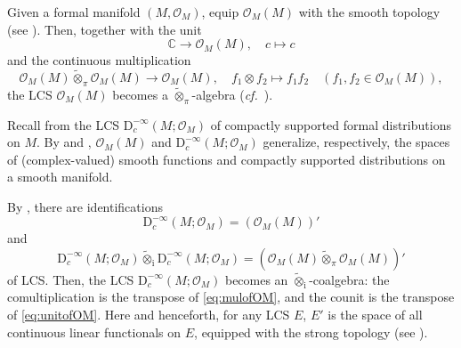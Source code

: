 \documentclass[12pt, a4paper]{amsart}
\newcommand{\BC}{{\mathbb {C}}}
\newcommand{\CO}{{\mathcal {O}}}
\newcommand{\RD}{{\mathrm {D}}}
\newcommand{\Ri}{{\mathrm{i}}}
\newcommand{\wt}{\widetilde}
\newcommand{\be}{\begin {equation}}
\newcommand{\ee}{\end {equation}}
\newcommand{\cf}{\textit{cf.}~}
\theoremstyle{Theorem}
\theoremstyle{Theorem}
\theoremstyle{Theorem}
\theoremstyle{Theorem}
\theoremstyle{Plain}
\theoremstyle{remark}
\theoremstyle{remark}
\theoremstyle{Definition}
\numberwithin{equation}{section}
\begin{document}
Given a formal manifold $(M,\mathcal{O}_M)$, equip $\mathcal{O}_M(M)$ with the smooth topology (see \cite[Definition 4.1]{CSW1}). Then, together with the unit
\begin{equation}\label{eq:unitofOM}
\mathbb{C} \rightarrow \mathcal{O}_M(M),\quad c \mapsto c
\end{equation}
and the continuous multiplication
\begin{equation}\label{eq:mulofOM}
\mathcal{O}_M(M) \wt{\otimes}_{\pi} \mathcal{O}_M(M) \rightarrow \mathcal{O}_M(M),\quad f_1 \otimes f_2 \mapsto f_1 f_2 \quad (f_1, f_2 \in \mathcal{O}_M(M)),
\end{equation}
the LCS $\mathcal{O}_M(M)$ becomes a $\wt{\otimes}_{\pi}$-algebra (\cf \cite[Proposition 4.8]{CSW1}).

Recall from \cite[Section 5]{CSW2} the LCS $\RD_c^{-\infty}(M;\mathcal{O}_M)$ of compactly supported formal distributions on $M$. By \cite[Example 4.2]{CSW1} and \cite[Theorem 1.1]{CSW2}, $\CO_M(M)$ and $\RD_c^{-\infty}(M;\mathcal{O}_M)$ generalize, respectively, the spaces of (complex-valued) smooth functions and compactly supported distributions on a smooth manifold.

By \cite[Proposition 5.14 and Lemma A.12]{CSW2}, there are  identifications
\be \label{eq:OM'}
\RD_c^{-\infty}(M;\mathcal{O}_M) = (\mathcal{O}_M(M))' 
\ee
and
\be \label{eq:DMM=DMDM}
\RD_c^{-\infty}(M;\mathcal{O}_M) \wt{\otimes}_{\mathrm{i}} \RD_c^{-\infty}(M;\mathcal{O}_M) = (\mathcal{O}_M(M) \wt{\otimes}_{\pi} \mathcal{O}_M(M))'
\ee
of LCS. Then, the LCS $\RD_c^{-\infty}(M;\mathcal{O}_M)$ becomes an  $\wt{\otimes}_{\mathrm{i}}$-coalgebra: the comultiplication is 
the transpose
of \eqref{eq:mulofOM}, and the counit is the transpose
of \eqref{eq:unitofOM}.  Here and henceforth, for any LCS $E$,  $E'$ is the space of all continuous linear functionals on $E$,  equipped with the strong topology (see \cite[Chapter 19]{Tr}).



\end{document}
